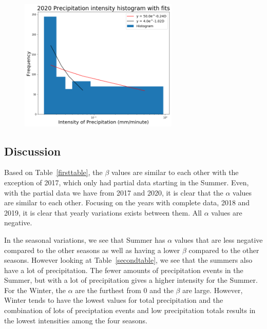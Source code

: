 \documentclass[11pt]{report}
\begin{document}
\begin{figure}[b]
	\centering
	\includegraphics[width=0.675\textwidth]{Figures/inten2020_fit.png}
	\caption[Fitting Intensity histogram for 2020 with different bins]
	{\label{i2020_fit}  }
\end{figure}

\clearpage


\subsection{Discussion}\label{sec:apcd}




Based on Table~\ref{firsttable}, the $\beta$ values are similar to
each other with the exception of 2017, which only had partial data
starting in the Summer. Even, with the partial data we have from 2017
and 2020, it is clear that the $\alpha$ values are similar to each
other. Focusing on the years with complete data, 2018 and 2019, it is
clear that yearly variations exists between them. All $\alpha$ values
are negative.

In the seasonal variations, we see that Summer has $\alpha$ values
that are less negative compared to the other seasons as well as having
a lower $\beta$ compared to the other seasons. However looking at
Table~\ref{secondtable}, we see that the summers also have a lot of
precipitation. The fewer amounts of precipitation events in the
Summer, but with a lot of precipitation gives a higher intensity for
the Summer. For the Winter, the $\alpha$ are the furthest from 0 and
the $\beta$ are large. However, Winter tends to have the lowest values
for total precipitation and the combination of lots of preciptation
events and low precipitation totals results in the lowest intensities
among the four seasons.
\end{document}
